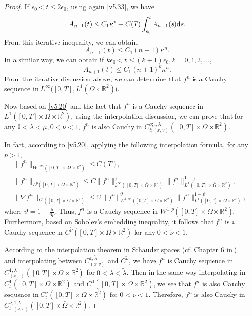 \documentclass[11pt,reqno]{amsart}%
\theoremstyle{definition}
\theoremstyle{remark}
\begin{document}
\begin{proof}
If $\epsilon_{0}< t\leq 2\epsilon_{0}$, using again \eqref{v5.33}, we have,
$$A_{n+1}(t)\leq C_{1}\kappa^{n}+C(T)\int^{t}_{\epsilon_{0}}A_{n-1}(s){\rm d}s.$$
From this iterative inequality, we can obtain,
$$A_{n+1}(t)\leq C_{1}(n+1)\kappa^{n}.$$
In a similar way, we can obtain if $ k\epsilon_{0}< t\leq (k+1)\epsilon_{0}, k=0,1,2,\ldots$,
$$A_{n+1}(t)\leq C_{1}(n+1)^{k}\kappa^{n}.$$
From the iterative discussion above, we can determine that $f^{n}$ is a Cauchy sequence in $L^{\infty}\big([0,T],L^{1}(\Omega\times\mathbb{R}^{2})\big)$.

Now based on   \eqref{v5.20} and  the fact that $f^{n}$ is a Cauchy sequence in $L^{1}([0,T]\times\Omega\times\mathbb{R}^{2})$,   using the interpolation discussion, we can prove that
for any $0< \lambda<\mu, 0<\nu < 1$, $f^{n}$ is also Cauchy in $C^{\nu;1,\lambda}_{t;(x,v)}([0,T]\times \bar{\Omega}\times \mathbb{R}^{2})$.

In fact, according to \eqref{v5.20}, applying the following  interpolation formula, for any $p>1$,
\begin{align}
&\|f^{n}\|_{W^{1,\infty}([0,T]\times\bar{\Omega}\times\mathbb{R}^{2})}\leq C(T),\nonumber\\
&\|f^{n}\|_{L^{p}([0,T]\times\bar{\Omega}\times\mathbb{R}^{2})}\leq C\|f^{n}\|^{\frac{1}{P}}_{L^{\infty}([0,T]\times\bar{\Omega}\times\mathbb{R}^{2})}\|f^{n}\|^{1-\frac{1}{P}}_{L^{1}([0,T]\times\bar{\Omega}\times\mathbb{R}^{2})},\nonumber\\
&\|\nabla f^{n}\|_{L^{p}([0,T]\times\bar{\Omega}\times\mathbb{R}^{2})}\leq
C\|f^{n}\|^{\vartheta}_{W^{1,\infty}([0,T]\times\bar{\Omega}\times\mathbb{R}^{2})}\|f^{n}\|^{1-\vartheta}_{L^{1}([0,T]\times\bar{\Omega}\times\mathbb{R}^{2})},\nonumber
\end{align}
where $\vartheta=1-\frac{5}{6p}$. Thus, $f^{n}$ is  a Cauchy sequence in $W^{1,p}([0,T]\times\Omega\times\mathbb{R}^{2})$.
Furthermore, based on Sobolev's embedding inequality, it follows that $f^{n}$ is  a Cauchy sequence in $C^{\tilde{\nu}}([0,T]\times\Omega\times\mathbb{R}^{2})$
 for any $0<\tilde{\nu}<1$.

According to the interpolation theorem in Schauder spaces (cf. Chapter 6 in \cite{GT}) and interpolating between $ C^{1,\tilde{\lambda}}_{(x,v)}$ and $C^{\tilde{\nu}}$, we have
$f^{n}$ is Cauchy sequence in $C^{1,\lambda}_{(x,v)}([0,T]\times\Omega\times\mathbb{R}^{2})$ for $0<\lambda<\tilde{\lambda}$. Then  in the same way  interpolating in $C^{1}_{t}([0,T]\times\Omega\times\mathbb{R}^{2})$ and $C^{0}([0,T]\times\Omega\times\mathbb{R}^{2})$, we see that $f^{n}$ is also Cauchy sequence in $C^{\nu}_{t}([0,T]\times\Omega\times\mathbb{R}^{2})$ for $0<\nu<1$. %
Therefore, $f^{n}$ is also Cauchy in $C^{\nu;1,\lambda}_{t;(x,v)}([0,T]\times \bar{\Omega}\times \mathbb{R}^{2})$.


\end{proof}
\end{document}
